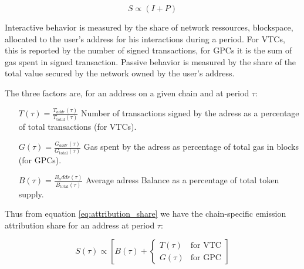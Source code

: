 \documentclass[11pt]{report}
\begin{document}
\begin{equation}
    S \propto (I + P)
    \label{eq:attribution_share}
\end{equation}

Interactive behavior is measured by the share of network ressources, blockspace, allocated to the user's address for his interactions during a period. For \ac{VTC}s, this is reported by the number of signed transactions, for \ac{GPC}s it is the sum of gas spent in signed transaction. Passive behavior is measured by the share of the total value secured by the network owned by the user's address.

The three factors are, for an address on a given chain and at period $\tau$:

\begin{description}[leftmargin=!, labelwidth=\widthof{\bfseries Passive Behavior}]

    \item[Interactive Behavior $(I)$] \hfill
        \begin{itemize}[labelwidth=4cm, align=left, labelsep=0pt]
            \item[\( T(\tau) = \frac{T_{addr}(\tau)}{T_{\text{total}}(\tau)} \)]
                Number of transactions signed by the adress as a percentage of total transactions (for VTCs).

            \item[\(G(\tau) = \frac{G_{addr}(\tau)}{G_{\text{total}}(\tau)} \)]
                Gas spent by the adress as percentage of total gas in blocks (for GPCs).
        \end{itemize}

    \item[Passive Behavior $P$] \hfil
        \begin{itemize}[labelwidth=4cm, align=left, labelsep=0pt]
            \item[\(B(\tau) = \frac{B_addr(\tau)}{B_{\text{total}}(\tau)} \)]
                Average adress Balance as a percentage of total token supply.
        \end{itemize}

\end{description}
\parsep 5pt
Thus from equation \eqref{eq:attribution_share} we have the chain-specific emission attribution share for an address at period $\tau$:


\begin{equation}
    S(\tau) \propto \left[B(\tau) + \begin{cases}
            T(\tau) & \text{for VTC} \\
            G(\tau) & \text{for GPC}
        \end{cases}\right]
    \label{eq:attribution_share_chain_type}
\end{equation}
\end{document}
